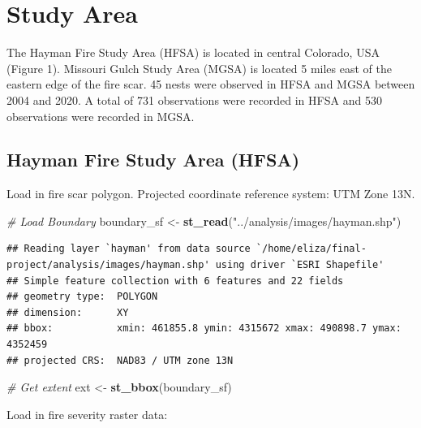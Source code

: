 \documentclass[]{article}
\newenvironment{Shaded}{\begin{snugshade}}{\end{snugshade}}
\newcommand{\CommentTok}[1]{\textcolor[rgb]{0.56,0.35,0.01}{\textit{#1}}}
\newcommand{\KeywordTok}[1]{\textcolor[rgb]{0.13,0.29,0.53}{\textbf{#1}}}
\newcommand{\NormalTok}[1]{#1}
\newcommand{\StringTok}[1]{\textcolor[rgb]{0.31,0.60,0.02}{#1}}
\begin{document}
\hypertarget{study-area}{%
\section{Study Area}\label{study-area}}

The Hayman Fire Study Area (HFSA) is located in central Colorado, USA
(Figure 1). Missouri Gulch Study Area (MGSA) is located 5 miles east of
the eastern edge of the fire scar. 45 nests were observed in HFSA and
MGSA between 2004 and 2020. A total of 731 observations were recorded in
HFSA and 530 observations were recorded in MGSA.

\hypertarget{hayman-fire-study-area-hfsa}{%
\subsection{Hayman Fire Study Area
(HFSA)}\label{hayman-fire-study-area-hfsa}}

Load in fire scar polygon. Projected coordinate reference system: UTM
Zone 13N.

\begin{Shaded}
\begin{Highlighting}[]
\CommentTok{# Load Boundary}
\NormalTok{boundary_sf <-}\StringTok{ }\KeywordTok{st_read}\NormalTok{(}\StringTok{"../analysis/images/hayman.shp"}\NormalTok{)}
\end{Highlighting}
\end{Shaded}

\begin{verbatim}
## Reading layer `hayman' from data source `/home/eliza/final-project/analysis/images/hayman.shp' using driver `ESRI Shapefile'
## Simple feature collection with 6 features and 22 fields
## geometry type:  POLYGON
## dimension:      XY
## bbox:           xmin: 461855.8 ymin: 4315672 xmax: 490898.7 ymax: 4352459
## projected CRS:  NAD83 / UTM zone 13N
\end{verbatim}

\begin{Shaded}
\begin{Highlighting}[]
\CommentTok{# Get extent}
\NormalTok{ext <-}\StringTok{ }\KeywordTok{st_bbox}\NormalTok{(boundary_sf)}
\end{Highlighting}
\end{Shaded}

Load in fire severity raster data:
\end{document}
